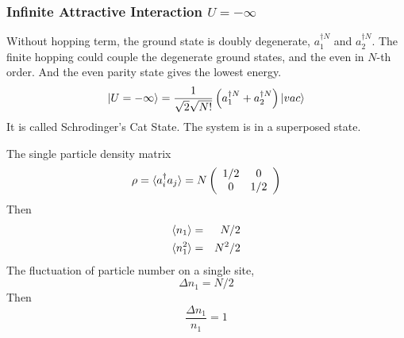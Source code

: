 \subsubsection{Infinite Attractive Interaction $U=-\infty$}

Without hopping term, the ground state is doubly degenerate, $a_1^{\dag N}$ and $a_2^{\dag N}$.
The finite hopping could couple the degenerate ground states, and the even in $N$-th order. And the even parity state gives the lowest energy.
\begin{equation}
\ket{U = -\infty} = \frac{1}{\sqrt{2}\sqrt{N!}}\left(a_1^{\dag N} + a_2^{\dag N}\right)\ket{vac}
\end{equation}
It is called Schrodinger's Cat State. The system is in a superposed state.

The single particle density matrix
\begin{equation}
\rho=\braket{a_i^\dag a_j} = N\left(\begin{array}{cc}
1/2 & 0\\
0 & 1/2
\end{array}\right)
\end{equation}
Then
\begin{eqnarray}
\braket{n_1} &=& N/2\\
\braket{n_1^2} &=& N^2/2
\end{eqnarray}
The fluctuation of particle number on a single site,
\begin{equation}
\Delta n_1 = N/2
\end{equation}
Then
\begin{equation}
\frac{\Delta n_1}{n_1} = 1
\end{equation}
